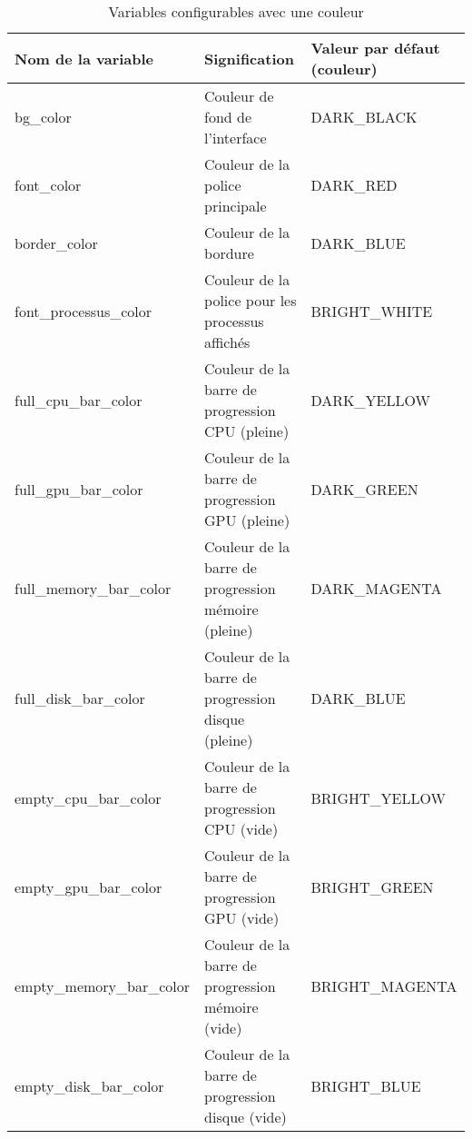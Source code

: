 \documentclass{article}
\begin{document}
\begin{table}[h!]
    \centering
    \renewcommand{\arraystretch}{1.5}
    \footnotesize
    \begin{tabular}{|>{\centering\arraybackslash}m{3.5cm}|>{\centering\arraybackslash}m{3.8cm}|>{\centering\arraybackslash}m{3cm}|}
        \hline
        \textbf{Nom de la variable} & \textbf{Signification} & \textbf{Valeur par défaut (couleur)} \\
        \hline
        bg\_color & Couleur de fond de l'interface & DARK\_BLACK \\
        \hline
        font\_color & Couleur de la police principale & DARK\_RED \\
        \hline
        border\_color & Couleur de la bordure & DARK\_BLUE \\
        \hline
        font\_processus\_color & Couleur de la police pour les processus affichés & BRIGHT\_WHITE \\
        \hline
        full\_cpu\_bar\_color & Couleur de la barre de progression CPU (pleine) & DARK\_YELLOW \\
        \hline
        full\_gpu\_bar\_color & Couleur de la barre de progression GPU (pleine) & DARK\_GREEN \\
        \hline
        full\_memory\_bar\_color & Couleur de la barre de progression mémoire (pleine) & DARK\_MAGENTA \\
        \hline
        full\_disk\_bar\_color & Couleur de la barre de progression disque (pleine) & DARK\_BLUE \\
        \hline
        empty\_cpu\_bar\_color & Couleur de la barre de progression CPU (vide) & BRIGHT\_YELLOW \\
        \hline
        empty\_gpu\_bar\_color & Couleur de la barre de progression GPU (vide) & BRIGHT\_GREEN \\
        \hline
        empty\_memory\_bar\_color & Couleur de la barre de progression mémoire (vide) & BRIGHT\_MAGENTA \\
        \hline
        empty\_disk\_bar\_color & Couleur de la barre de progression disque (vide) & BRIGHT\_BLUE \\
        \hline
    \end{tabular}
    \label{tab:configable_color_var}
    \caption{Variables configurables avec une couleur}
\end{table}

\newpage
\end{document}
